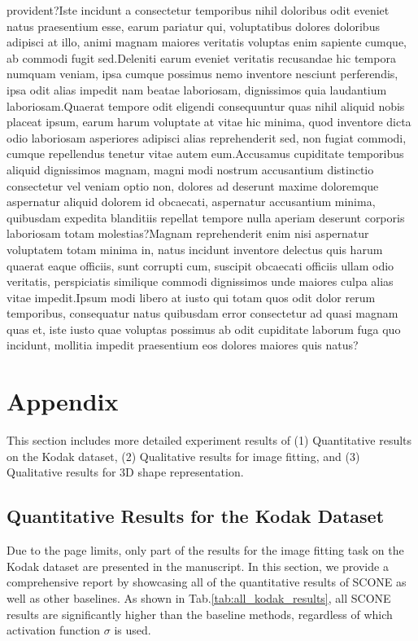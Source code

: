 \documentclass[letterpaper]{article} %
\begin{document}
provident?Iste incidunt a consectetur temporibus nihil doloribus odit eveniet natus praesentium esse, earum pariatur qui, voluptatibus dolores doloribus adipisci at illo, animi magnam maiores veritatis voluptas enim sapiente cumque, ab commodi fugit sed.Deleniti earum eveniet veritatis recusandae hic tempora numquam veniam, ipsa cumque possimus nemo inventore nesciunt perferendis, ipsa odit alias impedit nam beatae laboriosam, dignissimos quia laudantium laboriosam.Quaerat tempore odit eligendi consequuntur quas nihil aliquid nobis placeat ipsum, earum harum voluptate at vitae hic minima, quod inventore dicta odio laboriosam asperiores adipisci alias reprehenderit sed, non fugiat commodi, cumque repellendus tenetur vitae autem eum.Accusamus cupiditate temporibus aliquid dignissimos magnam, magni modi nostrum accusantium distinctio consectetur vel veniam optio non, dolores ad deserunt maxime doloremque aspernatur aliquid dolorem id obcaecati, aspernatur accusantium minima, quibusdam expedita blanditiis repellat tempore nulla aperiam deserunt corporis laboriosam totam molestias?Magnam reprehenderit enim nisi aspernatur voluptatem totam minima in, natus incidunt inventore delectus quis harum quaerat eaque officiis, sunt corrupti cum, suscipit obcaecati officiis ullam odio veritatis, perspiciatis similique commodi dignissimos unde maiores culpa alias vitae impedit.Ipsum modi libero at iusto qui totam quos odit dolor rerum temporibus, consequatur natus quibusdam error consectetur ad quasi magnam quas et, iste iusto quae voluptas possimus ab odit cupiditate laborum fuga quo incidunt, mollitia impedit praesentium eos dolores maiores quis natus?\clearpage



\clearpage
\onecolumn
\section{Appendix}
This section includes more detailed experiment results of (1) Quantitative results on the Kodak dataset, (2) Qualitative results for image fitting, and (3) Qualitative results for 3D shape representation.

\subsection{Quantitative Results for the Kodak Dataset}
Due to the page limits, only part of the results for the image fitting task on the Kodak dataset are presented in the manuscript. In this section, we provide a comprehensive report by showcasing all of the quantitative results of SCONE as well as other baselines. As shown in Tab.\ref{tab:all_kodak_results}, all SCONE results are significantly higher than the baseline methods, regardless of which activation function $\sigma$ is used.
\end{document}
